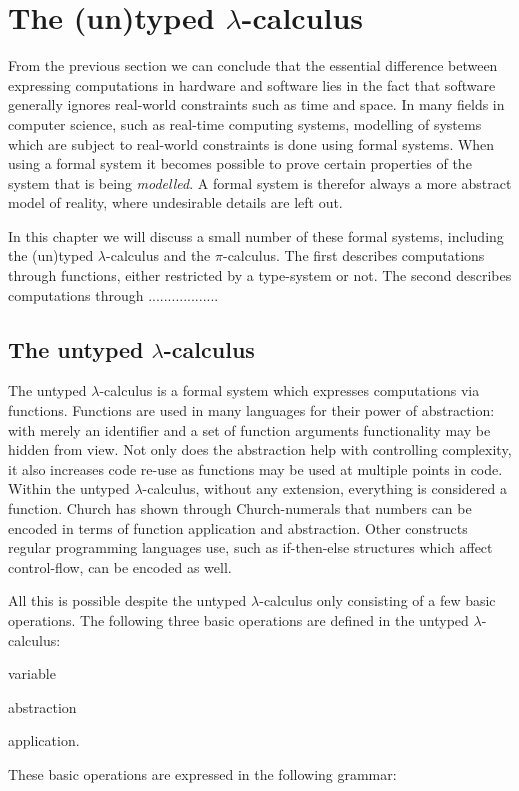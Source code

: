 \section{The (un)typed $\lambda$-calculus}
From the previous section we can conclude that the essential difference between expressing computations in hardware and software lies in the fact that software generally ignores real-world constraints such as time and space.
In many fields in computer science, such as real-time computing systems, modelling of systems which are subject to real-world constraints is done using formal systems.
When using a formal system it becomes possible to prove certain properties of the system that is being \textit{modelled}.
A formal system is therefor always a more abstract model of reality, where undesirable details are left out.

In this chapter we will discuss a small number of these formal systems, including the (un)typed $\lambda$-calculus and the $\pi$-calculus.
The first describes computations through functions, either restricted by a type-system or not.
The second describes computations through ..................

\subsection{The untyped $\lambda$-calculus}
The untyped $\lambda$-calculus is a formal system which expresses computations via functions.
Functions are used in many languages for their power of abstraction: with merely an identifier and a set of function arguments functionality may be hidden from view.
Not only does the abstraction help with controlling complexity, it also increases code re-use as functions may be used at multiple points in code.
Within the untyped $\lambda$-calculus, without any extension, everything is considered a function.
Church has shown through Church-numerals that numbers can be encoded in terms of function application and abstraction.
Other constructs regular programming languages use, such as if-then-else structures which affect control-flow, can be encoded as well.

All this is possible despite the untyped $\lambda$-calculus only consisting of a few basic operations.
The following three basic operations are defined in the untyped $\lambda$-calculus:
\begin{itemize*}
 \item variable
 \item abstraction
 \item application.
\end{itemize*}
These basic operations are expressed in the following grammar:

